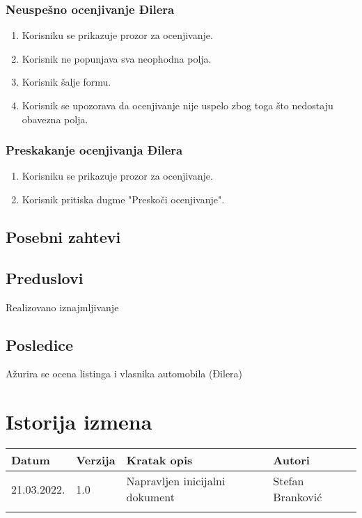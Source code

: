\documentclass[12pt]{article}
\begin{document}
\subsubsection{Neuspešno ocenjivanje Đilera}
\begin{enumerate}
  \item Korisniku se prikazuje prozor za ocenjivanje.
  \item Korisnik ne popunjava sva neophodna polja.
  \item Korisnik šalje formu.
  \item Korisnik se upozorava da ocenjivanje nije uspelo zbog toga što nedostaju obavezna polja.
\end{enumerate}

\subsubsection{Preskakanje ocenjivanja Đilera}
\begin{enumerate}
  \item Korisniku se prikazuje prozor za ocenjivanje.
  \item Korisnik pritiska dugme "Preskoči ocenjivanje".
\end{enumerate}

\subsection{Posebni zahtevi}
\subsection{Preduslovi}
Realizovano iznajmljivanje
\subsection{Posledice}
Ažurira se ocena listinga i vlasnika automobila (Đilera)
\section{Istorija izmena}
\begin{center}
\begin{tabular}{ | m{2cm} | m{1.5cm}| m{6cm} | m{5cm} | } 
\hline
Datum & Verzija & Kratak opis & Autori \\ 
\hline
 21.03.2022. & 1.0 & Napravljen inicijalni dokument & Stefan Branković\\ 
\hline
&&&\\ 
\hline
\end{tabular}
\end{center}
\end{document}
